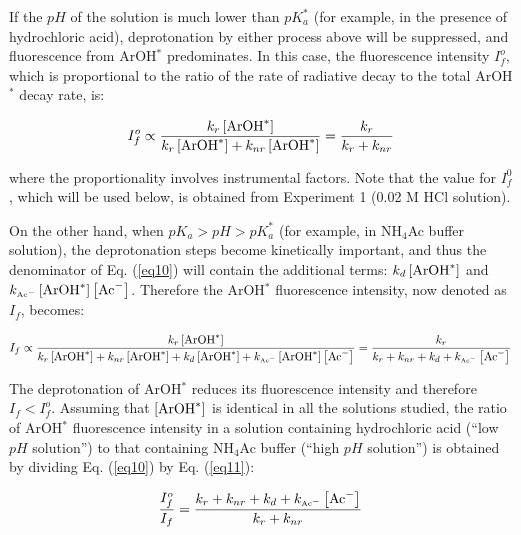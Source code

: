 \documentclass[byrevtex,amssymb,aps,pra,floatfix,letterpaper]{revtex4}
\begin{document}
If the $pH$ of the solution is much lower than $pK_a^*$ (for example, in the presence of hydrochloric acid), deprotonation by either process above will be suppressed, and fluorescence from ArOH$^*$ predominates. In this case, the fluorescence intensity $I_f^o$, which is proportional to the ratio of the rate of radiative decay to the total ArOH$^*$ decay rate, is:

\begin{equation}
I_f^o \propto \frac{k_r\left[\textnormal{ArOH}^*\right]}{k_r\left[\textnormal{ArOH}^*\right] + k_{nr}\left[\textnormal{ArOH}^*\right]} = \frac{k_r}{k_r + k_{nr}}
\label{eq10}
\end{equation}

\noindent
where the proportionality involves instrumental factors. Note that the value for $I_f^0$, which will be used below, is obtained from Experiment 1 (0.02 M HCl solution).

On the other hand, when $pK_a > pH > pK_a^*$ (for example, in NH$_4$Ac buffer solution), the deprotonation steps become kinetically important, and thus the denominator of Eq. (\ref{eq10}) will contain the additional terms: $k_d\left[\textnormal{ArOH}^*\right]$ and $k_{\textnormal{\tiny Ac}^-}\left[\textnormal{ArOH}^*\right]\left[\textnormal{Ac}^-\right]$. Therefore the ArOH$^*$ fluorescence intensity, now denoted as $I_f$, becomes:

\begin{equation}
I_f \propto \frac{k_r\left[\textnormal{ArOH}^*\right]}{k_r\left[\textnormal{ArOH}^*\right] + k_{nr}\left[\textnormal{ArOH}^*\right] + k_d\left[\textnormal{ArOH}^*\right] + k_{\textnormal{\tiny Ac}^-}\left[\textnormal{ArOH}^*\right]\left[\textnormal{Ac}^-\right]} = \frac{k_r}{k_r + k_{nr} + k_d + k_{\textnormal{\tiny Ac}^-}\left[\textnormal{Ac}^-\right]}
\label{eq11}
\end{equation}

\noindent
The deprotonation of ArOH$^*$ reduces its fluorescence intensity and therefore $I_f < I_f^o$. Assuming that $\left[\textnormal{ArOH}^*\right]$ is identical in all the solutions studied, the ratio of ArOH$^*$ fluorescence intensity in a solution containing hydrochloric acid (``low $pH$ solution'') to that containing NH$_4$Ac buffer (``high $pH$ solution'') is obtained by dividing Eq. (\ref{eq10}) by Eq. (\ref{eq11}):

\begin{equation}
\frac{I_f^o}{I_f} = \frac{k_r + k_{nr} + k_d + k_{\textnormal{\tiny Ac}^-}\left[\textnormal{Ac}^-\right]}{k_r + k_{nr}}
\label{eq12}
\end{equation}
\end{document}

